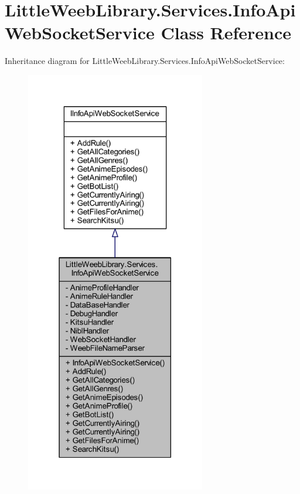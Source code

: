 \hypertarget{class_little_weeb_library_1_1_services_1_1_info_api_web_socket_service}{}\section{Little\+Weeb\+Library.\+Services.\+Info\+Api\+Web\+Socket\+Service Class Reference}
\label{class_little_weeb_library_1_1_services_1_1_info_api_web_socket_service}


Inheritance diagram for Little\+Weeb\+Library.\+Services.\+Info\+Api\+Web\+Socket\+Service\+:\nopagebreak
\begin{figure}[H]
\begin{center}
\leavevmode
\includegraphics[width=223pt]{class_little_weeb_library_1_1_services_1_1_info_api_web_socket_service__inherit__graph}
\end{center}
\end{figure}


